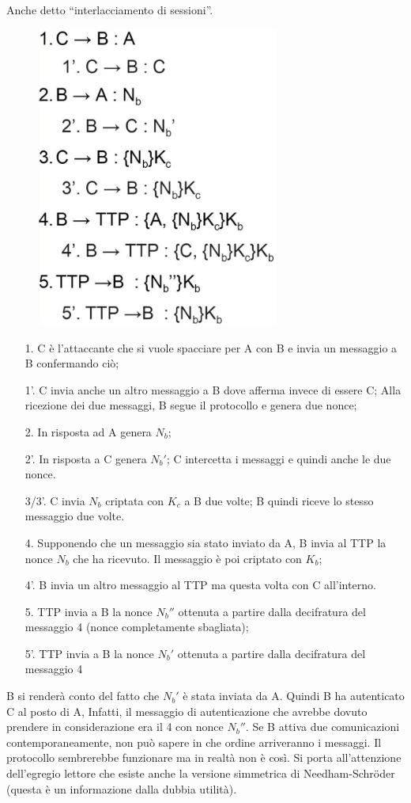 Anche detto “interlacciamento di sessioni”.
\begin{figure}[H]
    \centering
    \includegraphics[width=8cm, keepaspectratio]{capitoli/crittografia/imgs/mulan2.png}
\end{figure}
\begin{enumerate}
    \item[1.] C è l'attaccante che si vuole spacciare per A con
        B e invia un messaggio a B confermando ciò;
    \item[1'.] C invia anche un altro messaggio a B dove
        afferma invece di essere C; Alla ricezione dei due
        messaggi, B segue il protocollo e genera due nonce;
    \item[2.] In risposta ad A genera \(N_b\);
    \item[2'.] In risposta a C genera \(N_b'\);
        C intercetta i messaggi e quindi anche le due nonce.
    \item[3/3'.] C invia \(N_b\) criptata con \(K_c\) a B due volte;
        B quindi riceve lo stesso messaggio due volte.
    \item[4.] Supponendo che un messaggio sia stato inviato
        da A, B invia al TTP la nonce \(N_b\) che ha ricevuto. Il
        messaggio è poi criptato con \(K_b\);
    \item[4'.] B invia un altro messaggio al TTP ma questa
        volta con C all'interno.
    \item[5.] TTP invia a B la nonce \(N_b''\) ottenuta a partire dalla
        decifratura del messaggio 4 (nonce completamente
        sbagliata);
    \item[5'.] TTP invia a B la nonce \(N_b'\) ottenuta a partire dalla
        decifratura del messaggio 4
\end{enumerate}

B si renderà conto del fatto che \(N_b'\) è stata inviata da A. Quindi B ha
autenticato C al posto di A,
Infatti, il messaggio di autenticazione che avrebbe dovuto prendere in
considerazione era il 4 con
nonce \(N_b''\).
Se B attiva due comunicazioni contemporaneamente, non può sapere in che
ordine arriveranno i
messaggi.
Il protocollo sembrerebbe funzionare ma in realtà non è così.
Si porta all'attenzione dell'egregio lettore che esiste anche la versione
simmetrica di Needham-Schröder (questa è un informazione dalla
dubbia utilità).